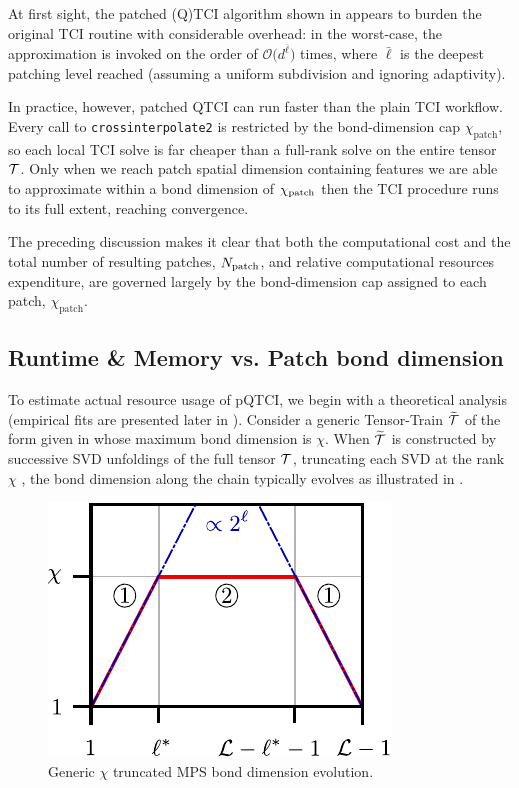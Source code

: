 At first sight, the patched (Q)TCI algorithm shown in  appears to burden the original TCI routine with considerable overhead: in the worst-case, the approximation is invoked on the order of $\mathcal{O}\bigl(d^{\bar\ell}\bigr)$ times, where $\bar\ell$ is the deepest patching level reached (assuming a uniform subdivision and ignoring adaptivity).

In practice, however, patched QTCI can run faster than the plain TCI workflow. Every call to \texttt{crossinterpolate2} is restricted by the bond-dimension cap $\chi_{\text{patch}}$, so each local TCI solve is far cheaper than a full-rank solve on the entire tensor $\mathcal{T}$. Only when we reach patch spatial dimension containing features we are able to approximate within a bond dimension of $\chi_{\text{patch}}$ then the TCI procedure runs to its full extent, reaching convergence. 

The preceding discussion makes it clear that both the computational cost and the total number of resulting patches, $N_{\text{patch}}$, and relative computational resources expenditure, are governed largely by the bond-dimension cap assigned to each patch, $\chi_{\text{patch}}$. 

\subsection{Runtime \& Memory vs. Patch bond dimension}

To estimate actual resource usage of pQTCI, we begin with a theoretical analysis (empirical fits are presented later in ). 
Consider a generic Tensor-Train $\widetilde{\mathcal{T}}$ of the form given in  whose maximum bond dimension is $\chi$. When $\widetilde{\mathcal{T}}$ is constructed by successive SVD unfoldings of the full tensor $\mathcal{T}$, truncating each SVD at the rank $\chi$ \cite{vonDelftTNNotes, Fannes1992, tensornetwork.org}, the bond dimension along the chain typically evolves  as illustrated in .

\begin{figure}[ht!]
	\centering
	\includegraphics{figures/TypicalBondDims.pdf}
	\caption{Generic $\chi$ truncated MPS bond dimension evolution.}
	\label{fig:typicalBondDim}
\end{figure}


